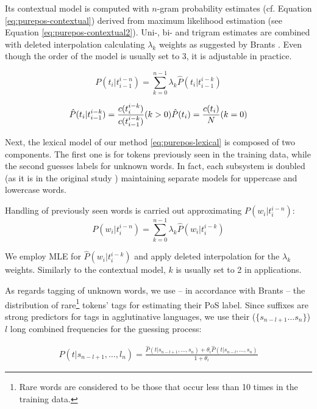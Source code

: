 Its contextual model is computed with $n$-gram probability estimates (cf. Equation \ref{eq:purepos-contextual}) derived from maximum likelihood estimation (see Equation \ref{eq:purepos-contextual2}). Uni-, bi- and trigram estimates are combined with deleted interpolation calculating $\lambda_k$ weights as suggested by Brants \cite{Brants2000}. Even though the order of the model is usually set to 3, it is adjustable in practice. 


\begin{equation}\label{eq:purepos-contextual}
P(t_i | t_{i-1}^{i-n}) = \sum_{k=0}^{n-1} \lambda_k \hat{P}(t_i|t_{i-1}^{i-k})
\end{equation}

\begin{equation}\label{eq:purepos-contextual2}
\hat{P}(t_i|t_{i-1}^{i-k}) = \frac{c(t^{i-k}_i)}{c(t_{i-1}^{i-k})} (k>0) \\
\hat{P}(t_i) = \frac{c(t_i)}{N} (k=0)
\end{equation}

Next, the lexical model of our method \eqref{eq:purepos-lexical} is composed of two components. 
The first one is for tokens previously seen in the training data, while the second guesses labels for unknown words. 
In fact, each subsystem is doubled (as it is in the original study \cite{Brants2000}) maintaining separate models for uppercase and lowercase words. 

Handling of previously seen words is carried out approximating $P(w_i | t_{i}^{i-n})$: 
\begin{equation} \label{eq:purepos-lexical}
P(w_i | t_{i}^{i-n}) = \sum_{k=0}^{n-1} \lambda_k \hat{P}(w_i|t_{i}^{i-k})
\end{equation}

\label{sec:purepos-guesser}
We employ MLE for $\hat{P}(w_i|t_{i}^{i-k})$ and apply deleted interpolation for the $\lambda_k$ weights. 
Similarly to the contextual model, $k$ is usually set to 2 in applications.

As regards tagging of unknown words, we use -- in accordance with Brants -- the distribution of rare\footnote{Rare words are considered to be those that occur less than 10 times in the training data.}
 tokens’ tags for estimating their PoS label. Since suffixes are strong predictors for tags in agglutinative languages, we use their ($\{s_{n-l+1} \dots s_n\}$) $l$ long combined frequencies for the guessing process:

\begin{align}
 P(t|s_{n-l+1}, \dots, l_n) 
 = \frac{ \hat{P}(t|s_{n-l+1}, \dots, s_n) + \theta_i \hat{P}(t|s_{n-l}, \dots, s_n)}{1+\theta_i}
\end{align}


